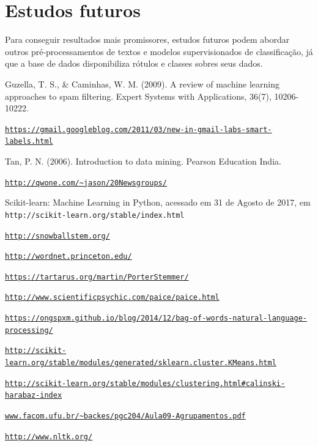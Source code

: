 \documentclass[conference]{IEEEtran}
\begin{document}
\section{Estudos futuros}
Para conseguir resultados mais promissores, estudos futuros podem abordar outros pré-processamentos de textos e modelos supervisionados de classificação, já que a base de dados disponibiliza rótulos e classes sobres seus dados.

\begin{thebibliography}{00}

Guzella, T. S., \& Caminhas, W. M. (2009). A review of machine learning approaches to spam filtering. Expert Systems with Applications, 36(7), 10206-10222.

\texttt{\url{https://gmail.googleblog.com/2011/03/new-in-gmail-labs-smart-labels.html}}

Tan, P. N. (2006). Introduction to data mining. Pearson Education India.

\texttt{\url{http://qwone.com/~jason/20Newsgroups/}}

 Scikit-learn: Machine Learning in Python, acessado em 31 de Agosto de 2017, em \texttt{http://scikit-learn.org/stable/index.html}

 \texttt{\url{http://snowballstem.org/}}

 \texttt{\url{http://wordnet.princeton.edu/}}

 \texttt{\url{https://tartarus.org/martin/PorterStemmer/}}

 \texttt{\url{http://www.scientificpsychic.com/paice/paice.html}}

 \texttt{\url{https://ongspxm.github.io/blog/2014/12/bag-of-words-natural-language-processing/}}

 \texttt{\url{http://scikit-learn.org/stable/modules/generated/sklearn.cluster.KMeans.html}}

 \texttt{\url{http://scikit-learn.org/stable/modules/clustering.html\#calinski-harabaz-index}}

 \texttt{\url{www.facom.ufu.br/~backes/pgc204/Aula09-Agrupamentos.pdf}}

 \texttt{\url{http://www.nltk.org/}}

\end{thebibliography}
\end{document}
